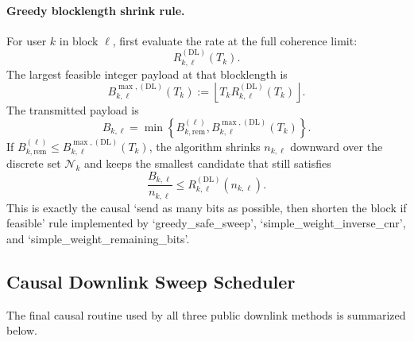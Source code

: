 \documentclass[11pt]{article}
\newcommand{\Nset}{\mathcal{N}}
\newcommand{\floor}[1]{\left\lfloor #1 \right\rfloor}
\newcommand{\DL}{\mathrm{DL}}
\begin{document}
\paragraph{Greedy blocklength shrink rule.}
For user $k$ in block $\ell$, first evaluate the rate at the full coherence limit:
\begin{equation}
R_{k,\ell}^{(\DL)}(T_k).
\label{eq:dl-rate-at-T}
\end{equation}
The largest feasible integer payload at that blocklength is
\begin{equation}
B_{k,\ell}^{\max,(\DL)}(T_k)
:=
\floor{
T_k R_{k,\ell}^{(\DL)}(T_k)
}.
\label{eq:dl-bmax-T}
\end{equation}
The transmitted payload is
\begin{equation}
B_{k,\ell}
=
\min\!\left\{
B_{k,\mathrm{rem}}^{(\ell)},
B_{k,\ell}^{\max,(\DL)}(T_k)
\right\}.
\label{eq:dl-bused}
\end{equation}
If $B_{k,\mathrm{rem}}^{(\ell)} \le B_{k,\ell}^{\max,(\DL)}(T_k)$, the algorithm shrinks $n_{k,\ell}$ downward over the discrete set $\Nset_k$ and keeps the smallest candidate that still satisfies
\begin{equation}
\frac{B_{k,\ell}}{n_{k,\ell}}
\le
R_{k,\ell}^{(\DL)}(n_{k,\ell}).
\label{eq:dl-greedy-shrink}
\end{equation}
This is exactly the causal `send as many bits as possible, then shorten the block if feasible' rule implemented by `greedy\_safe\_sweep', `simple\_weight\_inverse\_cnr', and `simple\_weight\_remaining\_bits'.

\subsection{Causal Downlink Sweep Scheduler}
The final causal routine used by all three public downlink methods is summarized below.
\end{document}
